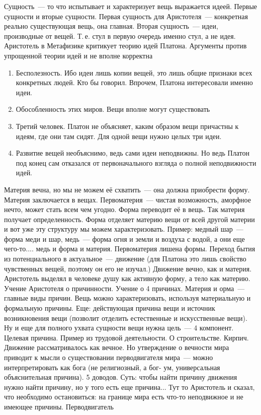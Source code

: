 Сущность~--- то что испытывает и характеризует вещь выражается идеей. Первые сущности и вторые сущности. Первая сущность для Аристотеля~--- конкретная реально существующая вещь, она главная. Вторая сущность~--- идеи, производные от вещей. Т.\,е. стул в первую очередь именно стул, а не идея. Аристотель в Метафизике критикует теорию идей Платона. Аргументы против упрощенной теории идей и не вполне корректна

\begin{enumerate}
	\item Бесполезность. Ибо идеи лишь копии вещей, это лишь общие признаки всех конкретных людей. Кто бы говорил. Впрочем, Платона интересовали именно идеи. 
	\item Обособленность этих миров. Вещи вполне могут существовать
	\item Третий человек. Платон не объясняет, каким образом вещи причастны к идеям, где они там сидят. Для одной вещи нужно целых три идеи. 
	\item Развитие вещей необъяснимо, ведь сами идеи неподвижны. Но ведь Платон под конец сам отказался от первоначального взгляда о полной неподвижности идей. 
\end{enumerate}

Материя вечна, но мы не можем её схватить~--- она должна приобрести форму. Материя заключается в вещах. Первоматерия~--- чистая возможность, аморфное нечто, может стать всем чем угодно. Форма переводит её в вещь. Так материя получает определенность. Форма отделяет материю вещи от всей другой материи и вот уже эту структуру мы можем характеризовать. Пример: медный шар~--- форма меди и шар, медь~--- форма огня и земли и воздуха с водой, а они еще чего-то.... медь и форма и материя. Первоматерия лишена формы. Переход бытия из потенциального в актуальное~--- движение (для Платона это лишь свойство чувственных вещей, поэтому он его не изучал.) Движение вечно, как и материя. 
Аристотель выделял в человеке душу как активную форму, а тело как материю. 
Учение Аристотеля о причинности. Учение о 4 причинах. Материя и орма~--- главные виды причин. Вещь можно характеризовать, используя материальную и формальную причины. Еще: действующая причина вещи и источник возникновения вещи (позволит отделить естественные и искусственные вещи). Ну и еще для полного ухвата сущности вещи нужна цель~--- 4 компонент. Целевая причина. 
Пример из трудовой деятельности. О строительстве. Кирпич. 
Движение рассматривалось как вечное. Но утверждение о вечности мира приводит к мысли о существовании перводвигателя мира~--- можно интерпретировать как бога (не религиозный, а бог- ум, универсальная объяснительная причина). 5 доводов. Суть: чтобы найти причину движения нужно найти причину, но у того есть еще причина... Тут то Аристотель и сказал, что необходимо остановиться: на границе мира есть что-то неподвижное и не имеющее причины. 
Перводвигатель

